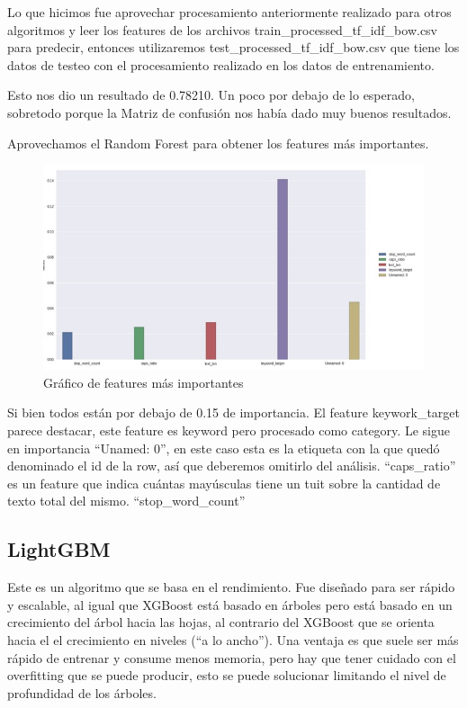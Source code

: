 \documentclass[12pt]{article}
\begin{document}
Lo que hicimos fue aprovechar procesamiento anteriormente realizado para otros algoritmos y leer los features de los archivos train\_processed\_tf\_idf\_bow.csv para predecir, entonces utilizaremos test\_processed\_tf\_idf\_bow.csv que tiene los datos de testeo con el procesamiento realizado en los datos de entrenamiento.

Esto nos dio un resultado de 0.78210. Un poco por debajo de lo esperado, sobretodo porque la Matriz de confusión nos había dado muy buenos resultados.

Aprovechamos el Random Forest para obtener los features más importantes.



\begin{figure}[H]
    \centering
    \includegraphics[scale = 0.9]{imgs/graph_2.jpg}
    \caption{Gráfico de features más importantes}
    \label{tp:fig:equilibrium}
\end{figure}

Si bien todos están por debajo de 0.15 de importancia. El feature keywork\_target parece destacar, este feature es keyword pero procesado como category. Le sigue en importancia “Unamed: 0”, en este caso esta es la etiqueta con la que quedó denominado el id de la row, así que deberemos omitirlo del análisis.
“caps\_ratio” es un feature que indica cuántas mayúsculas tiene un tuit sobre la cantidad de texto total del mismo.
“stop\_word\_count” 


\subsection{LightGBM}
Este es un algoritmo que se basa en el rendimiento. Fue diseñado para ser rápido y escalable, al igual que XGBoost está basado en árboles pero está basado en un crecimiento del árbol hacia las hojas, al contrario del XGBoost que se orienta hacia el el crecimiento en niveles (“a lo ancho”). Una ventaja es que suele ser más rápido de entrenar y consume menos memoria, pero hay que tener cuidado con el overfitting que se puede producir, esto se puede solucionar limitando el nivel de profundidad de los árboles.
\end{document}
